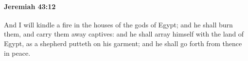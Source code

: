 
		\paragraph{Jeremiah 43:12} %
			\label{JEREMIAH-43-12}

			And I will kindle a fire in the houses of the gods of Egypt; and he shall burn them, and carry them away captives: and he shall array himself with the land of Egypt, as a shepherd putteth on his garment; and he shall go forth from thence in peace.


